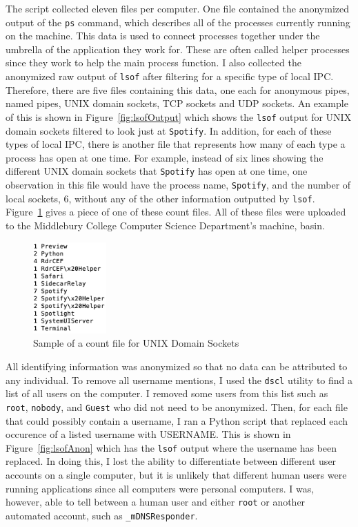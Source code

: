 The script collected eleven files per computer.  One file contained the anonymized output of the \texttt{ps} command, which describes all of the processes currently running on the machine.  This data is used to connect processes together under the umbrella of the application they work for.  These are often called helper processes since they work to help the main process function.  I also collected the anonymized raw output of \texttt{lsof} after filtering for a specific type of local IPC.  Therefore, there are five files containing this data, one each for anonymous pipes, named pipes, UNIX domain sockets, TCP sockets and UDP sockets.  An example of this is shown in Figure~\ref{fig:lsofOutput} which shows the \texttt{lsof} output for UNIX domain sockets filtered to look just at \texttt{Spotify}.  In addition, for each of these types of local IPC, there is another file that represents how many of each type a process has open at one time.  For example, instead of six lines showing the different UNIX domain sockets that \texttt{Spotify} has open at one time, one observation in this file would have the process name, \texttt{Spotify}, and the number of local sockets, 6, without any of the other information outputted by \texttt{lsof}.  Figure~\ref{fig:countOutput} gives a piece of one of these count files.  All of these files were uploaded to the Middlebury College Computer Science Department's machine, basin.

\begin{figure}
\centering
\includegraphics[width=0.25\textwidth]{countOutput.png}
\caption{Sample of a count file for UNIX Domain Sockets}
\label{fig:countOutput}
\end{figure}

All identifying information was anonymized so that no data can be attributed to any individual.  To remove all username mentions, I used the \texttt{dscl} utility to find a list of all users on the computer.  I removed some users from this list such as \texttt{root}, \texttt{nobody}, and \texttt{Guest} who did not need to be anonymized.  Then, for each file that could possibly contain a username, I ran a Python script that replaced each occurence of a listed username with USERNAME.  This is shown in Figure~\ref{fig:lsofAnon} which has the \texttt{lsof} output where the username has been replaced.  In doing this, I lost the ability to differentiate between different user accounts on a single computer, but it is unlikely that different human users were running applications since all computers were personal computers.  I was, however, able to tell between a human user and either \texttt{root} or another automated account, such as \texttt{\_mDNSResponder}.

